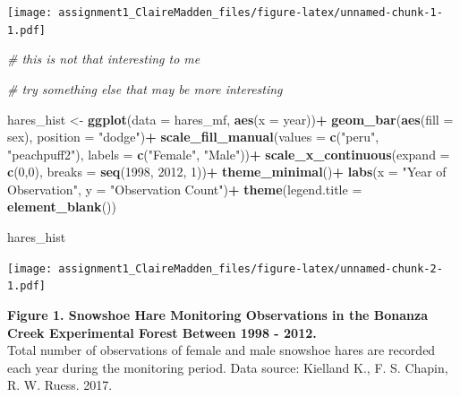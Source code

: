 \documentclass[]{article}
\newenvironment{Shaded}{\begin{snugshade}}{\end{snugshade}}
\newcommand{\KeywordTok}[1]{\textcolor[rgb]{0.13,0.29,0.53}{\textbf{#1}}}
\newcommand{\DataTypeTok}[1]{\textcolor[rgb]{0.13,0.29,0.53}{#1}}
\newcommand{\DecValTok}[1]{\textcolor[rgb]{0.00,0.00,0.81}{#1}}
\newcommand{\StringTok}[1]{\textcolor[rgb]{0.31,0.60,0.02}{#1}}
\newcommand{\CommentTok}[1]{\textcolor[rgb]{0.56,0.35,0.01}{\textit{#1}}}
\newcommand{\OperatorTok}[1]{\textcolor[rgb]{0.81,0.36,0.00}{\textbf{#1}}}
\newcommand{\NormalTok}[1]{#1}
\begin{document}
\texttt{[image: assignment1\_ClaireMadden\_files/figure-latex/unnamed-chunk-1-1.pdf]}

\begin{Shaded}
\begin{Highlighting}[]
\CommentTok{# this is not that interesting to me}
\end{Highlighting}
\end{Shaded}

\begin{Shaded}
\begin{Highlighting}[]
\CommentTok{# try something else that may be more interesting}

\NormalTok{hares_hist <-}\StringTok{ }\KeywordTok{ggplot}\NormalTok{(}\DataTypeTok{data =}\NormalTok{ hares_mf, }\KeywordTok{aes}\NormalTok{(}\DataTypeTok{x =}\NormalTok{ year))}\OperatorTok{+}
\StringTok{  }\KeywordTok{geom_bar}\NormalTok{(}\KeywordTok{aes}\NormalTok{(}\DataTypeTok{fill =}\NormalTok{ sex), }\DataTypeTok{position =} \StringTok{"dodge"}\NormalTok{)}\OperatorTok{+}
\StringTok{  }\KeywordTok{scale_fill_manual}\NormalTok{(}\DataTypeTok{values =} \KeywordTok{c}\NormalTok{(}\StringTok{"peru"}\NormalTok{, }\StringTok{"peachpuff2"}\NormalTok{), }\DataTypeTok{labels =} \KeywordTok{c}\NormalTok{(}\StringTok{"Female"}\NormalTok{, }\StringTok{"Male"}\NormalTok{))}\OperatorTok{+}
\StringTok{  }\KeywordTok{scale_x_continuous}\NormalTok{(}\DataTypeTok{expand =} \KeywordTok{c}\NormalTok{(}\DecValTok{0}\NormalTok{,}\DecValTok{0}\NormalTok{),}
                     \DataTypeTok{breaks =} \KeywordTok{seq}\NormalTok{(}\DecValTok{1998}\NormalTok{, }\DecValTok{2012}\NormalTok{, }\DecValTok{1}\NormalTok{))}\OperatorTok{+}
\StringTok{  }\KeywordTok{theme_minimal}\NormalTok{()}\OperatorTok{+}
\StringTok{  }\KeywordTok{labs}\NormalTok{(}\DataTypeTok{x =} \StringTok{"Year of Observation"}\NormalTok{,}
       \DataTypeTok{y =} \StringTok{"Observation Count"}\NormalTok{)}\OperatorTok{+}
\StringTok{  }\KeywordTok{theme}\NormalTok{(}\DataTypeTok{legend.title =} \KeywordTok{element_blank}\NormalTok{())}

\NormalTok{hares_hist}
\end{Highlighting}
\end{Shaded}

\texttt{[image: assignment1\_ClaireMadden\_files/figure-latex/unnamed-chunk-2-1.pdf]}

\textbf{Figure 1. Snowshoe Hare Monitoring Observations in the Bonanza
Creek Experimental Forest Between 1998 - 2012.}\\
Total number of observations of female and male snowshoe hares are
recorded each year during the monitoring period. Data source: Kielland
K., F. S. Chapin, R. W. Ruess. 2017.
\end{document}
